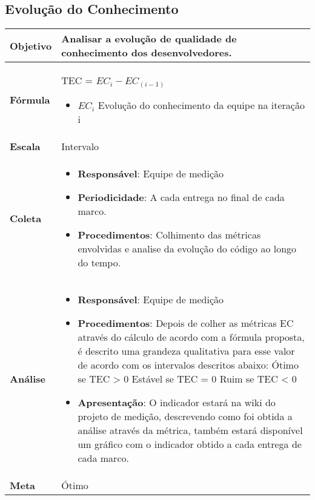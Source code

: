 \subsection{Evolução do Conhecimento}

	\begin{tabular}{ |p{3cm}|p{12cm}| }      
	 \hline
    \textbf{Objetivo} & Analisar a evolução de qualidade de conhecimento dos desenvolvedores. \\
   \hline
    \textbf{Fórmula} & TEC = $EC_i - EC_(i-1)$ \begin{itemize}
			\item $EC_i$ Evolução do conhecimento da equipe na iteração i
		\end{itemize}\\
   \hline
    \textbf{Escala} & Intervalo \\
   \hline
    \textbf{Coleta} & \begin{itemize}
		 \item \textbf{Responsável}: Equipe de medição
     \item \textbf{Periodicidade}: A cada entrega no final de cada marco.
     \item \textbf{Procedimentos}: Colhimento das métricas envolvidas e analise da evolução do código ao longo do tempo.
    \end{itemize} \\
   \hline
    \textbf{Análise} & \begin{itemize} \item \textbf{Responsável}: Equipe de medição
    \item \textbf{Procedimentos}: Depois de colher as métricas EC através do cálculo de acordo com a fórmula proposta, é descrito uma grandeza qualitativa para esse valor de acordo com os intervalos descritos abaixo:
		 \subitem Ótimo se TEC > 0
		 \subitem Estável se TEC = 0
		 \subitem Ruim se TEC < 0
	\item \textbf{Apresentação}: O indicador estará na wiki do projeto de medição, descrevendo como foi obtida a análise através da métrica, também estará disponível um gráfico com o indicador obtido a cada entrega de cada marco.
	\end{itemize} \\
  \hline
	 \textbf{Meta} & Ótimo \\
	\hline

\end{tabular}
	